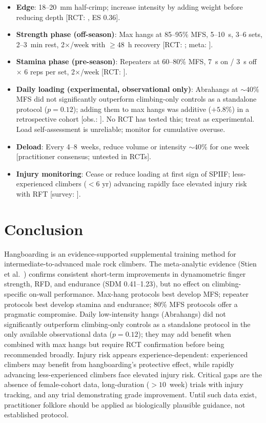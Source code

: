 \documentclass[12pt,a4paper]{article}
\begin{document}
\begin{itemize}[noitemsep, topsep=2pt]
  \item \textbf{Edge}: 18--20~mm half-crimp; increase intensity by adding weight before reducing depth \textnormal{[RCT: \cite{mundry2021}, ES 0.36]}.
  \item \textbf{Strength phase (off-season)}: Max hangs at 85--95\% MFS, 5--10~s, 3--6 sets, 2--3~min rest, 2$\times$/week with $\geq48$~h recovery \textnormal{[RCT: \cite{lopezrivera2019,mundry2021}; meta: \cite{stien2023}]}.
  \item \textbf{Stamina phase (pre-season)}: Repeaters at 60--80\% MFS, 7~s on / 3~s off $\times$ 6 reps per set, 2$\times$/week \textnormal{[RCT: \cite{hermans2022,devise2022}]}.
  \item \textbf{Daily loading (experimental, observational only)}: Abrahangs at ${\sim}40\%$ MFS did not significantly outperform climbing-only controls as a standalone protocol ($p = 0.12$); adding them to max hangs was additive ($+5.8\%$) in a retrospective cohort \textnormal{[obs.: \cite{gilmore2024}]}. No RCT has tested this; treat as experimental. Load self-assessment is unreliable; monitor for cumulative overuse.
  \item \textbf{Deload}: Every 4--8~weeks, reduce volume or intensity ${\sim}40\%$ for one week \textnormal{[practitioner consensus; untested in RCTs]}.
  \item \textbf{Injury monitoring}: Cease or reduce loading at first sign of SPIIF; less-experienced climbers ($<6$ yr) advancing rapidly face elevated injury risk with RFT \textnormal{[survey: \cite{sjoman2023}]}.
\end{itemize}

\section{Conclusion}

Hangboarding is an evidence-supported supplemental training method for intermediate-to-advanced male rock climbers. The meta-analytic evidence (Stien et al.\ \cite{stien2023}) confirms consistent short-term improvements in dynamometric finger strength, RFD, and endurance (SDM 0.41--1.23), but no effect on climbing-specific on-wall performance. Max-hang protocols best develop MFS; repeater protocols best develop stamina and endurance; 80\% MFS protocols offer a pragmatic compromise. Daily low-intensity hangs (Abrahangs) did not significantly outperform climbing-only controls as a standalone protocol in the only available observational data ($p = 0.12$); they may add benefit when combined with max hangs but require RCT confirmation before being recommended broadly. Injury risk appears experience-dependent: experienced climbers may benefit from hangboarding's protective effect, while rapidly advancing less-experienced climbers face elevated injury risk. Critical gaps are the absence of female-cohort data, long-duration ($>\!10$~week) trials with injury tracking, and any trial demonstrating grade improvement. Until such data exist, practitioner folklore should be applied as biologically plausible guidance, not established protocol.
\end{document}
